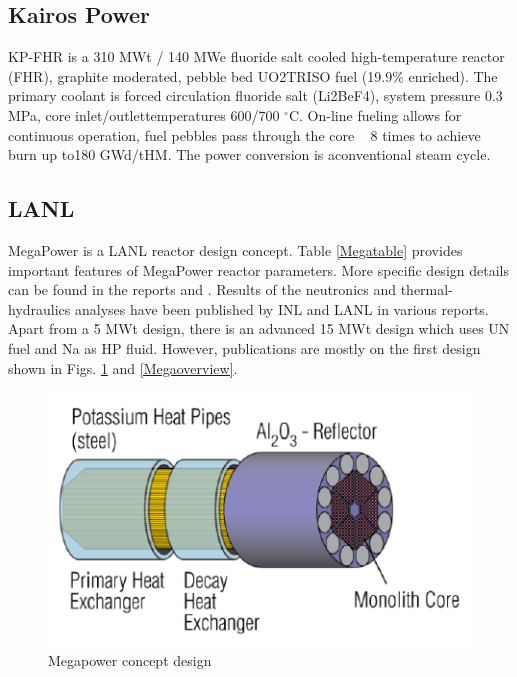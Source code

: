 \subsection{Kairos  Power}
KP-FHR is  a  310  MWt  /  140  MWe  fluoride  salt  cooled  high-temperature  reactor  (FHR),  graphite moderated,  pebble  bed  UO2TRISO  fuel  (19.9\%  enriched). The  primary coolant  is  forced  circulation  fluoride  salt (Li2BeF4), system pressure 0.3 MPa, core inlet/outlettemperatures 600/700 $^\circ{}$C. On-line fueling allows for continuous operation, fuel pebbles pass through the core ~ 8 times to achieve burn up to180 GWd/tHM. The power conversion is aconventional steam cycle.

\subsection{LANL}
MegaPower is a LANL reactor design concept. Table \ref{Megatable} provides important features of MegaPower reactor parameters. More specific design details can be found in the reports \cite{sterbentz_special_2017} and \cite{mcclure_design_2015}. Results of the neutronics and thermal-hydraulics analyses have been published by \gls{INL} and LANL in various reports. Apart from a 5 MWt design, there is an advanced 15 MWt design which uses UN fuel and Na as HP fluid. However, publications are mostly on the first design shown in Figs. \ref{Megadesign} and \ref{Megaoverview}. 

\begin{figure}[hbtp]
\centering
\includegraphics[scale=0.8]{Figs/megacore.jpeg}
\caption{Megapower concept design}
\label{Megadesign}
\end{figure}

